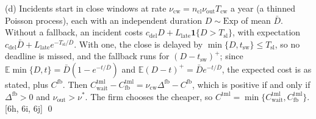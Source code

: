 (d) Incidents start in close windows at rate $\nu_{\mathrm{cw}}=n_{\mathrm{cl}}\nu_{\mathrm{out}}T_{\mathrm{cw}}$ a year (a thinned Poisson process), each with an independent duration $D\sim\mathrm{Exp}$ of mean $\bar D$. Without a fallback, an incident costs $c_{\mathrm{del}}D+L_{\mathrm{late}}\mathbf 1\{D>T_{\mathrm{sl}}\}$, with expectation $c_{\mathrm{del}}\bar D+L_{\mathrm{late}}e^{-T_{\mathrm{sl}}/\bar D}$. With one, the close is delayed by $\min\{D,t_{\mathrm{sw}}\}\le T_{\mathrm{sl}}$, so no deadline is missed, and the fallback runs for $(D-t_{\mathrm{sw}})^+$; since $\mathbb E\min\{D,t\}=\bar D(1-e^{-t/\bar D})$ and $\mathbb E(D-t)^+=\bar De^{-t/\bar D}$, the expected cost is as stated, plus $C^{\mathrm{fb}}$. Then $C^{\mathrm{tml}}_{\mathrm{wait}}-C^{\mathrm{tml}}_{\mathrm{fb}}=\nu_{\mathrm{cw}}\Delta^{\mathrm{fb}}-C^{\mathrm{fb}}$, which is positive if and only if $\Delta^{\mathrm{fb}}>0$ and $\nu_{\mathrm{out}}>\nu^*$. The firm chooses the cheaper, so $C^{\mathrm{tml}}=\min\{C^{\mathrm{tml}}_{\mathrm{wait}},C^{\mathrm{tml}}_{\mathrm{fb}}\}$. [6h, 6i, 6j] \qed
